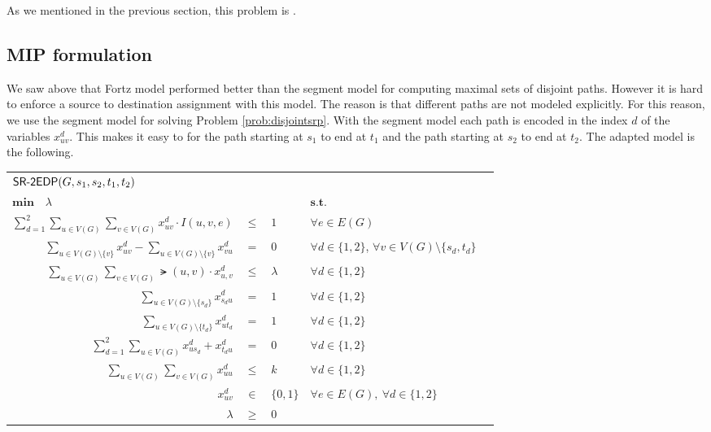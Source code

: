 As we mentioned in the previous section, this problem is \NPhard \cite{minmax-disjoint-90, Li1990}.

\subsection{MIP formulation}

We saw above that Fortz model performed better than the segment model for computing maximal sets of disjoint paths.
However it is hard to enforce a source to destination assignment with this model. The reason is that different paths are not
modeled explicitly. For this reason, we use the segment model for solving Problem \ref{prob:disjointsrp}. With the segment model
each path is encoded in the index $d$ of the variables $x^d_{uv}$. This makes it easy to for the path starting at $s_1$ to end at $t_1$ and the
path starting at $s_2$ to end at $t_2$. The adapted model is the following.

\begin{center}
\begin{tabular}{rcllr}
\multicolumn{5}{l}{$\textsf{SR-2EDP}(G, s_1, s_2, t_1, t_2)$} \\[0.5cm] 
\multicolumn{3}{l}{$\mathbf{min} \quad \lambda$} & $\textbf{s.t.}$ & \\[0.5cm]
$\displaystyle \sum_{d = 1}^2 \sum_{u \in V(G)} \sum_{v \in V(G)}  x^d_{uv} \cdot I(u, v, e)$ & $\leq$ & $1$ & $\forall e \in E(G)$ & \\[0.5cm]
$\displaystyle \sum_{u \in V(G) \setminus \{ v \}} x^d_{uv} - \sum_{u \in V(G) \setminus \{ v \}} x^d_{vu}$ & $=$    &  $0$ & $\forall d \in \{1,2\}$, $\forall v \in V(G) \setminus \{ s_d, t_d \}$ & \\[0.5cm]
$\displaystyle \sum_{u \in V(G)} \sum_{v \in V(G)} \lat(u, v) \cdot x^d_{u, v}$ & $\leq$    & $\lambda$ & $\forall d \in \{ 1, 2 \}$ \\[0.5cm]
$\displaystyle \sum_{u \in V(G) \setminus \{ s_d \}} x^d_{s_d u}$ & $=$    & $1$ & $\forall d \in \{ 1, 2 \}$ \\[0.5cm]
$\displaystyle \sum_{u \in V(G) \setminus \{ t_d \}} x^d_{u t_d}$ & $=$    & $1$ & $\forall d \in \{ 1, 2 \}$ \\[0.5cm]
$\displaystyle \sum_{d = 1}^2 \sum_{u \in V(G)} x^d_{u s_d} +  x^d_{t_d u}$ & $=$    & $0$ & $\forall d \in \{ 1, 2 \}$ \\[0.5cm]
$\displaystyle \sum_{u \in V(G)} \sum_{v \in V(G)} x^d_{uu}$ & $\leq$      & $k$ & $\forall d \in \{ 1, 2 \}$ \\[0.5cm]
$x^d_{uv}$  &    $\in$    &  $\{0, 1\}$  & $\forall e \in E(G), \ \forall d \in \{1, 2 \}$ & \\[0.5cm]
$\lambda$   &    $\geq$   & $0$ & &
\end{tabular}
\end{center}


